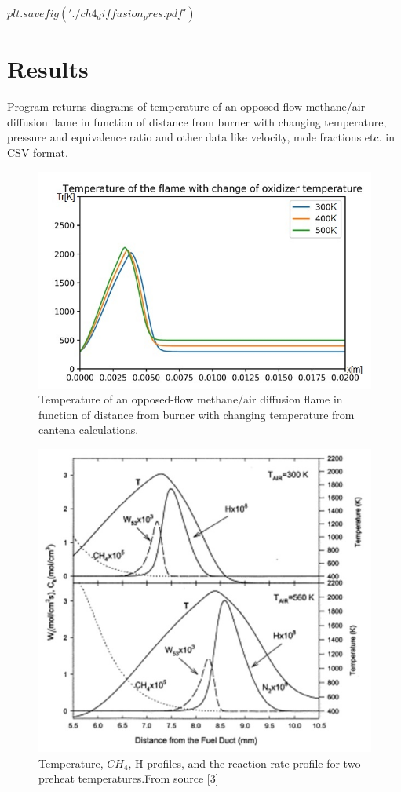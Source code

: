 \documentclass[a4paper]{article}
\begin{document}
$plt.savefig('./ch4_diffusion_pres.pdf')$


\section{Results}
Program returns diagrams of temperature of an opposed-flow methane/air diffusion flame in function of distance from burner with changing temperature, pressure and equivalence ratio and other data like velocity, mole fractions etc. in CSV format.
\begin{figure}[h!]
\includegraphics[width=1\textwidth]{1.jpg}
\caption{\label{fig:1}Temperature of an opposed-flow methane/air diffusion flame in function of distance from burner with changing temperature from cantena calculations.}
\end{figure}

\begin{figure}
\includegraphics[width=1\textwidth]{2.jpg}
\caption{\label{fig:2}Temperature, $CH_4$, H profiles, and the reaction rate profile for two preheat temperatures.From source [3]}
\end{figure}
\end{document}
